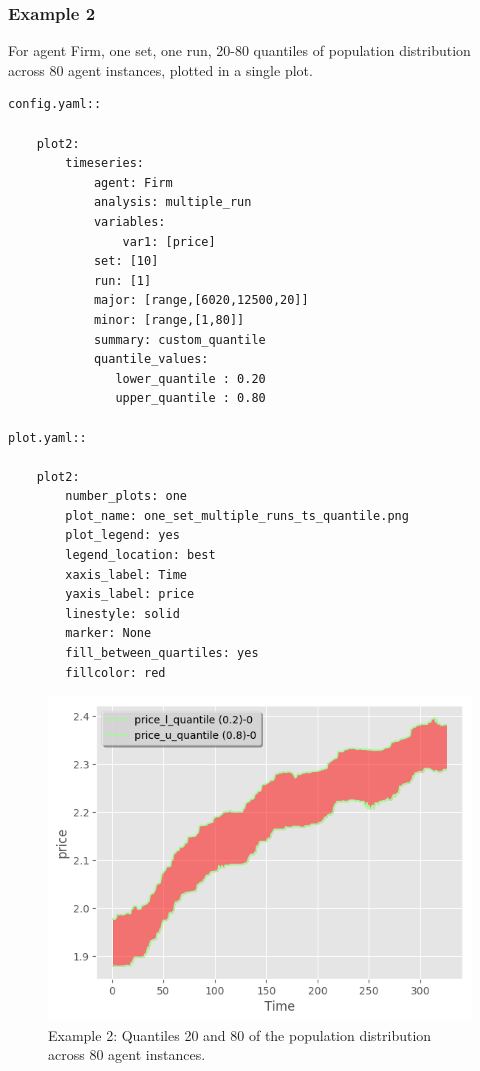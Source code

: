 \documentclass[10pt,a4paper]{article}
\begin{document}
\clearpage
\subsubsection{Example 2}
For agent Firm, one set, one run, 20-80 quantiles of population distribution across 80 agent instances, plotted in a single plot.

\begin{lstlisting}
config.yaml::

    plot2:
        timeseries:
            agent: Firm
            analysis: multiple_run
            variables:
                var1: [price]
            set: [10]
            run: [1]
            major: [range,[6020,12500,20]]
            minor: [range,[1,80]] 
            summary: custom_quantile
            quantile_values:          
               lower_quantile : 0.20
               upper_quantile : 0.80

plot.yaml::

    plot2:
        number_plots: one
        plot_name: one_set_multiple_runs_ts_quantile.png
        plot_legend: yes
        legend_location: best
        xaxis_label: Time
        yaxis_label: price
        linestyle: solid
        marker: None
        fill_between_quartiles: yes
        fillcolor: red
\end{lstlisting}

\begin{figure}[b!]\centering\leavevmode
\includegraphics[scale=.6]{./plots_tut_2/one_set_multiple_runs_ts_quantile_0.png}
\caption{\footnotesize  Example 2: Quantiles 20 and 80 of the population distribution across 80 agent instances.}
\end{figure}
\end{document}
